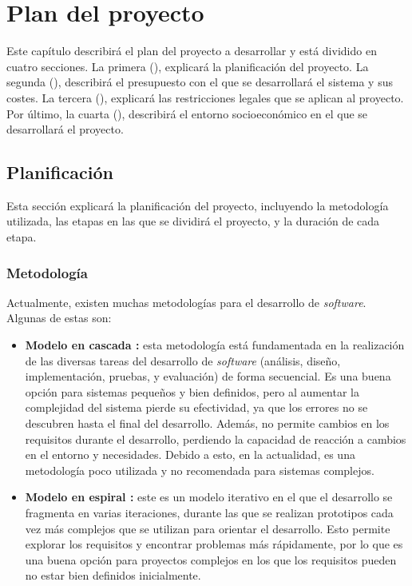 \chapter{Plan del proyecto}\label{chap:planning}

Este capítulo describirá el plan del proyecto a desarrollar y está
dividido en cuatro secciones. La primera (), explicará la
planificación del proyecto. La segunda (), describirá el
presupuesto con el que se desarrollará el sistema y sus costes. La tercera
(), explicará las restricciones legales que se aplican al
proyecto. Por último, la cuarta (), describirá el
entorno socioeconómico en el que se desarrollará el proyecto.

\newcommand{\componentref}[1]{\hyperref[req:#1]{`#1'}}

\section{Planificación}\label{sec:plan}

Esta sección explicará la planificación del proyecto, incluyendo la metodología
utilizada, las etapas en las que se dividirá el proyecto, y la duración de cada
etapa.

\subsection{Metodología}

Actualmente, existen muchas metodologías para el desarrollo de \textit{software}.
Algunas de estas son:

\begin{itemize}
    \item \textbf{Modelo en cascada \parencite{waterfall-model}:} esta
    metodología está fundamentada en la realización de las diversas tareas del
    desarrollo de \textit{software} (análisis, diseño, implementación, pruebas,
    y evaluación) de forma secuencial. Es una buena opción para sistemas
    pequeños y bien definidos, pero al aumentar la complejidad del sistema
    pierde su efectividad, ya que los errores no se descubren hasta el final del
    desarrollo. Además, no permite cambios en los requisitos durante el
    desarrollo, perdiendo la capacidad de reacción a cambios en el entorno y
    necesidades. Debido a esto, en la actualidad, es una metodología poco
    utilizada y no recomendada para sistemas complejos.
    \item \textbf{Modelo en espiral \parencite{spiral-model}:} este es un modelo
    iterativo en el que el desarrollo se fragmenta en varias iteraciones, durante
    las que se realizan prototipos cada vez más complejos que se utilizan
    para orientar el desarrollo. Esto permite explorar los requisitos y
    encontrar problemas más rápidamente, por lo que es una buena opción para
    proyectos complejos en los que los requisitos pueden no estar bien definidos
    inicialmente.
\end{itemize}

